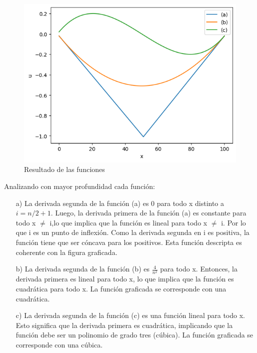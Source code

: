 \begin{figure}[H]
\centerline{\includegraphics[scale=0.45]{./img/resultado_tridiag}}
\caption{Resultado de las funciones}
\label{result_laplaciano}
\end{figure}

Analizando con mayor profundidad cada función:\par
\begin{enumerate}
    \item[a)] La derivada segunda de la función (a) es 0 para todo x distinto a $i = n/2 + 1$. Luego, la derivada primera de la función (a) es constante para todo x $\not =$ i,lo que implica que la función es lineal para todo x $\not =$ i. Por lo que i es un punto de inflexión. Como la derivada segunda en i es positiva, la función tiene que ser cóncava para los positivos. Esta función descripta es coherente con la figura graficada.

    \item[b)] La derivada segunda de la función (b) es $\frac{4}{n^2}$ para todo x. Entonces, la derivada primera es lineal para todo x, lo que implica que la función es cuadrática para todo x. La función graficada se corresponde con una cuadrática.

    \item[c)] La derivada segunda de la función (c) es una función lineal para todo x. Esto significa que la derivada primera es cuadrática, implicando que la función debe ser un polinomio de grado tres (cúbica). La función graficada se corresponde con una cúbica.
\end{enumerate}

